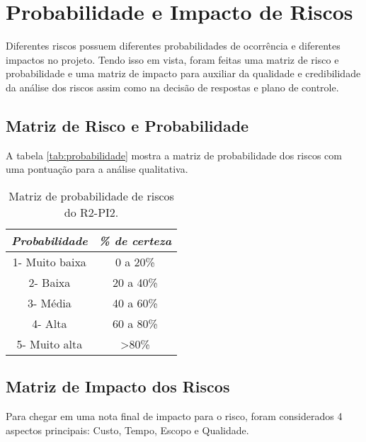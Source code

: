 \section{Probabilidade e Impacto de Riscos} %
 \label{sec:probabilidade_e_impacto_de_riscos}
 
 Diferentes riscos possuem diferentes probabilidades de ocorrência e diferentes impactos no projeto. Tendo isso em vista, foram feitas uma matriz de risco e probabilidade e uma matriz de impacto para auxiliar da qualidade e credibilidade da análise dos riscos assim como na decisão de respostas e plano de controle.

 \subsection{Matriz de Risco e Probabilidade} %
 \label{sub:matriz_de_risco_e_probabilidade}

 A tabela \ref{tab:probabilidade} mostra a matriz de probabilidade dos riscos com uma pontuação para a análise qualitativa.

 \begin{table}[H]
	\centering
	\caption{Matriz de probabilidade de riscos do R2-PI2.}
	\label{my-label}
	\begin{tabular}{|c|c|}
		\hline
		\rowcolor[HTML]{C0C0C0} 
		\textit{\textbf{Probabilidade}} & \textit{\textbf{\% de certeza}} \\ \hline
		1- Muito baixa                  & 0 a 20\%                        \\ \hline
		2- Baixa                        & 20 a 40\%                       \\ \hline
		3- Média                        & 40 a 60\%                       \\ \hline
		4- Alta                         & 60 a 80\%                       \\ \hline
		5- Muito alta                   & \textgreater80\%                \\ \hline
	\end{tabular}
\end{table}
 
 \subsection{Matriz de Impacto dos Riscos} %
 \label{sub:matriz_de_impacto_dos_riscos}
 
 Para chegar em uma nota final de impacto para o risco, foram considerados 4 aspectos principais: Custo, Tempo, Escopo e Qualidade.


